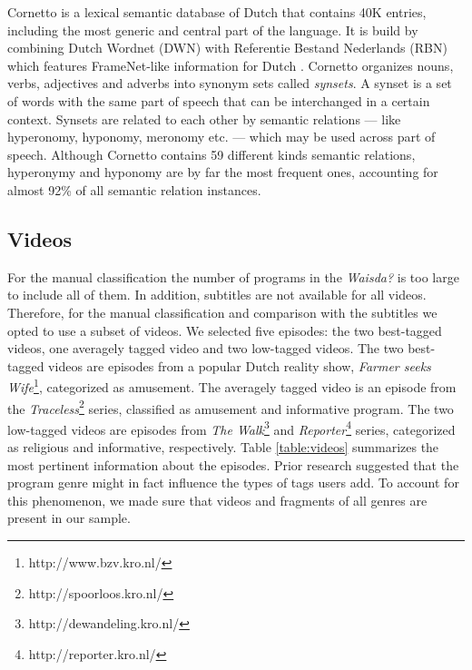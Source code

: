 Cornetto is a lexical semantic database of Dutch that contains 40K entries, including the most generic and central part of the language. It is build by combining Dutch Wordnet (DWN) with Referentie Bestand Nederlands (RBN) which features FrameNet-like information for Dutch \cite{Vossen08}. Cornetto organizes nouns, verbs, adjectives and adverbs into synonym sets called \textit{synsets}. A synset is a set of words with the same part of speech that can be interchanged in a certain context. Synsets are related to each other by semantic relations --- like hyperonomy, hyponomy, meronomy etc. --- which may be used across part of speech. Although Cornetto contains 59 different kinds semantic relations, hyperonymy and hyponomy are by far the most frequent ones, accounting for almost 92\% of all semantic relation instances.

\subsection{Videos}\label{videos}

For the manual classification the number of programs in the \emph{Waisda?} is
too large to include all of them. In addition, subtitles are not available for
all videos. Therefore, for the manual classification and comparison with the
subtitles we opted to use a subset of videos. We selected five episodes: the two
best-tagged videos, one averagely tagged video and two low-tagged videos. The
two best-tagged videos are episodes from a popular Dutch reality show,
\textit{Farmer seeks Wife}\footnote{http://www.bzv.kro.nl/}, categorized as
amusement. The averagely tagged video is an episode from the
\textit{Traceless}\footnote{http://spoorloos.kro.nl/} series, classified as
amusement and informative program. The two low-tagged videos are episodes from
\textit{The Walk}\footnote{http://dewandeling.kro.nl/} and
\textit{Reporter}\footnote{http://reporter.kro.nl/} series, categorized as
religious and informative, respectively. Table \ref{table:videos} summarizes
the most pertinent information about the episodes. Prior research
\cite{waisda} suggested that the program genre might in fact influence the
types of tags users add. To account for this phenomenon, we made sure that
videos and fragments of all genres are present in our sample.

